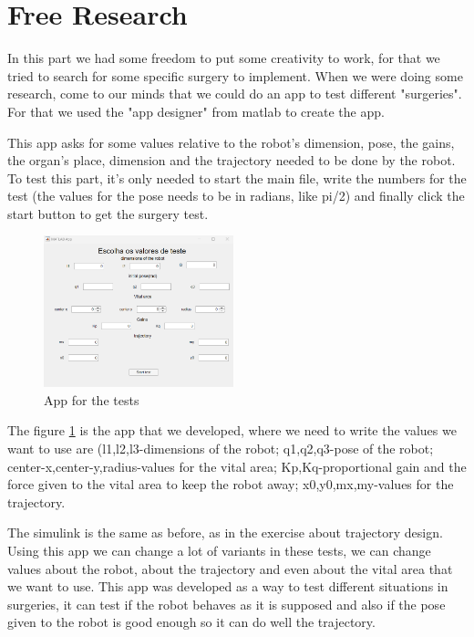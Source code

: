 \section{Free Research}

In this part we had some freedom to put some creativity to work, for that we tried to search for some specific surgery to implement. When we were doing some research, come to our minds that we could do an app to test different "surgeries". For that we used the "app designer" from matlab to create the app. 

This app asks for some values relative to the robot's dimension, pose, the gains, the organ's place, dimension and the trajectory needed to be done by the robot. To test this part, it's only needed to start the main file, write the numbers for the test (the values for the pose needs to be in radians, like pi/2) and finally click the start button to get the surgery test.

\begin{figure}[H]
    \centering
    \includegraphics[width=0.49\textwidth]{imgs/f3.png}
    \caption{App for the tests}
    \label{fig:f3}
\end{figure}

The figure \ref{fig:f3} is the app that we developed, where we need to write the values we want to use are (l1,l2,l3-dimensions of the robot; q1,q2,q3-pose of the robot; center-x,center-y,radius-values for the vital area; Kp,Kq-proportional gain and the force given to the vital area to keep the robot away; x0,y0,mx,my-values for the trajectory. 

The simulink is the same as before, as in the exercise about trajectory design. Using this app we can change a lot of variants in these tests, we can change values about the robot, about the trajectory and even about the vital area that we want to use. This app was developed as a way to test different situations in surgeries, it can test if the robot behaves as it is supposed and also if the pose given to the robot is good enough so it can do well the trajectory. 

